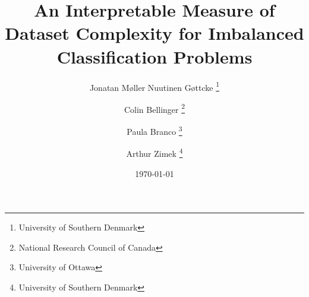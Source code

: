 \documentclass[twoside,leqno,twocolumn]{article}
\begin{document}
%
\newcommand\relatedversion{}
\renewcommand\relatedversion{\thanks{The full version of the paper can be accessed at \protect\url{https://arxiv.org/abs/1902.09310}}} %



\title{\Large An Interpretable Measure of Dataset Complexity for Imbalanced Classification Problems}
\author{Jonatan Møller Nuutinen Gøttcke \thanks{University of Southern Denmark}
\and Colin Bellinger \thanks{National Research Council of Canada} 
\and Paula Branco \thanks{University of Ottawa}
\and Arthur Zimek \thanks{University of Southern Denmark}}

\date{\today}

\maketitle






\end{document}
